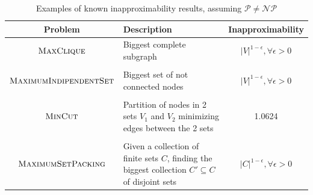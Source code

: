 \begin{table}
	\centering
	\caption{Examples of known inapproximability results, assuming $\mathcal{P}
			\neq \mathcal{NP} $ \cite{10.1007/3-540-63248-4_10} }
	\label{tab:inapproximability-examples}
	\begin{tabular}{c|p{5cm}|c}
		Problem                                                          & Description                                                   & Inapproximability \\
		\hline
		$ \textsc{MaxClique} $                                           & Biggest complete subgraph                                     & $|V|^{1-
		\epsilon}, \forall \epsilon > 0 $                                                                                                                    \\
		                                                                 &                                                               &                   \\
		$ \textsc{MaximumIndipendentSet} $                               &
		Biggest set of not connected nodes                               & $|V|^{1-
		\epsilon}, \forall \epsilon > 0 $                                                                                                                    \\
		                                                                 &                                                               &                   \\
		$ \textsc{MinCut} $                                              & Partition of nodes in 2 sets $V_1$ and $V_2$ minimizing edges
		between the 2 sets                                               & 1.0624                                                                            \\
		                                                                 &                                                               &                   \\
		$ \textsc{MaximumSetPacking} $                                   & Given a collection of
		finite sets $C$,
		finding the biggest collection $C' \subseteq C$ of disjoint sets & $|C|^{1-
		\epsilon}, \forall \epsilon > 0 $                                                                                                                    \\
	\end{tabular}
\end{table}

